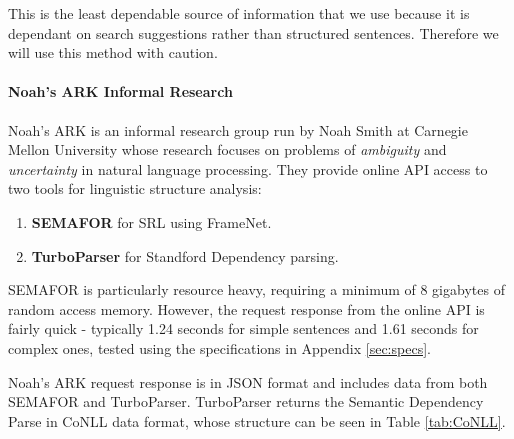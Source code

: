 This is the least dependable source of information that we use because it is dependant on search suggestions rather than structured sentences. Therefore we will use this method with caution.

\paragraph{Noah's ARK Informal Research}
Noah's ARK is an informal research group run by Noah Smith at Carnegie Mellon University\cite{ark} whose research focuses on problems of \textit{ambiguity} and \textit{uncertainty} in natural language processing. They provide online API access to two tools for linguistic structure analysis:
\begin{enumerate}
\item{\textbf{SEMAFOR}\cite{chen2010semafor} for SRL using FrameNet.}
\item{\textbf{TurboParser}\cite{turboparser} for Standford Dependency parsing.}
\end{enumerate}   

SEMAFOR is particularly resource heavy, requiring a minimum of 8 gigabytes of random access memory. However, the request response from the online API is fairly quick - typically 1.24 seconds for simple sentences and 1.61 seconds for complex ones, tested using the specifications in Appendix \ref{sec:specs}.

Noah's ARK request response is in JSON format and includes data from both SEMAFOR and TurboParser. TurboParser returns the Semantic Dependency Parse in CoNLL data format, whose structure can be seen in Table \ref{tab:CoNLL}. 


